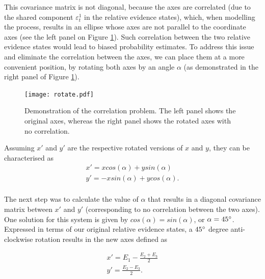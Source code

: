 \documentclass[11pt,a4paper]{article}
\begin{document}
This covariance matrix is not diagonal, because the axes are correlated (due to the shared component $\varepsilon_{t}^{1}$ in the relative evidence states), which, when modelling the process, results in an ellipse whose axes are not parallel to the coordinate axes (see the left panel on Figure \ref{fig:rotate}). Such correlation between the two relative evidence states would lead to biased probability estimates. To address this issue and eliminate the correlation between the axes, we can place them at a more convenient position, by rotating both axes by an angle $\alpha$ (as demonstrated in the right panel of Figure \ref{fig:rotate}). 

\begin{figure}[htb!]
\captionsetup{justification=centering}
\centering
\caption{Demonstration of the correlation problem. The left panel shows the original axes, whereas the right panel shows the rotated axes with no correlation.}
\texttt{[image: rotate.pdf]}
\label{fig:rotate}
\end{figure}
 

Assuming $x'$ and $y'$ are the respective rotated versions of $x$ and $y$, they can be characterised as
\begin{equation}
\begin{array}{l}
\displaystyle x' = x cos(\alpha) + y sin(\alpha)\\
\displaystyle y' = -x sin(\alpha) + y cos(\alpha).\\
\end{array} 
\label{eq:axes2}
\end{equation}

The next step was to calculate the value of $\alpha$ that results in a diagonal covariance matrix between $x'$ and $y'$ (corresponding to no correlation between the two axes). One solution for this system is given by $cos(\alpha) = sin(\alpha)$, or $\alpha = 45\degree$. Expressed in terms of our original relative evidence states, a $45\degree$ degree anti-clockwise rotation results in the new axes defined as

\begin{equation}
\begin{array}{l}
\displaystyle x' = E_{1}-\frac{E_{2}+E_{3}}{2}\\
\displaystyle y' = \frac{E_{2}-E_{3}}{2}.\\
\end{array} 
\label{eq:axes1}
\end{equation}
 
\end{document}
